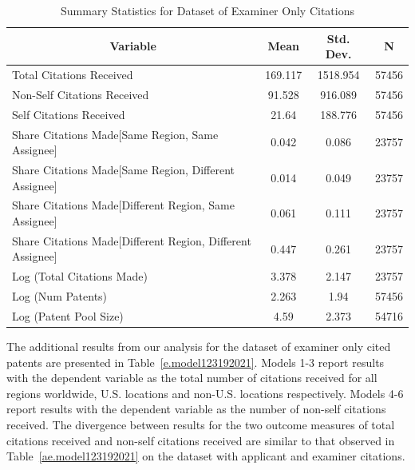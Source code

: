 \documentclass[12pt,letterpaper]{article}
\begin{document}
\begin{table}[htbp]\centering \caption{Summary Statistics for Dataset of Examiner Only Citations \label{e.sumstat}}
\scriptsize
\singlespacing
\begin{tabular}{l c c  c}\hline\hline
\multicolumn{1}{c}{\textbf{Variable}} & \textbf{Mean}
 & \textbf{Std. Dev.} & \textbf{N}\\ \hline
Total Citations Received & 169.117 & 1518.954  & 57456\\
Non-Self Citations Received& 91.528 & 916.089  & 57456\\
Self Citations Received& 21.64 & 188.776  & 57456\\
Share Citations Made[Same Region, Same Assignee] & 0.042 & 0.086  & 23757\\
Share Citations Made[Same Region, Different Assignee] & 0.014 & 0.049  & 23757\\
Share Citations Made[Different Region, Same Assignee] & 0.061 & 0.111  & 23757\\
Share Citations Made[Different Region, Different Assignee] & 0.447 & 0.261  & 23757\\
Log (Total Citations Made) & 3.378 & 2.147  & 23757\\
Log (Num Patents) & 2.263 & 1.94  & 57456\\
Log (Patent Pool Size) & 4.59 & 2.373  & 54716\\
\hline
\end{tabular}
\end{table}

The additional results from our analysis for the dataset of examiner only cited patents are presented in Table~\ref{e.model123192021}. Models 1-3 report results with the dependent variable as the total number of citations received for all regions worldwide, U.S. locations and non-U.S. locations respectively. Models 4-6 report results with the dependent variable as the number of non-self citations received. The divergence between results for the two outcome measures of total citations received and non-self citations received are similar to that observed in Table~\ref{ae.model123192021} on the dataset with applicant and examiner citations. \par
\end{document}
